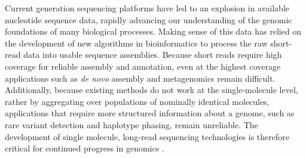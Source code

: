 \documentclass{biophys_letter}
\begin{document}
\vspace*{2.7pt}

\twocolumn


Current generation sequencing platforms have led to an explosion in available nucleotide sequence data, rapidly advancing our understanding of the genomic foundations of many biological processes.
Making sense of this data has relied on the development of new algorithms in bioinformatics to process the raw short-read data into usable sequence assemblies.
Because short reads require high coverage for reliable assembly and annotation, even at the highest coverage applications such as {\it de novo} assembly and metagenomics remain difficult.
Additionally, because existing methods do not work at the single-molecule level, rather by aggregating over populations of nominally identical molecules, applications that require more structured information about a genome, such as rare variant detection and haplotype phasing, remain unreliable.
The development of single molecule, long-read sequencing technologies is therefore critical for continued progress in genomics \cite{Mak:2012}.
\end{document}
